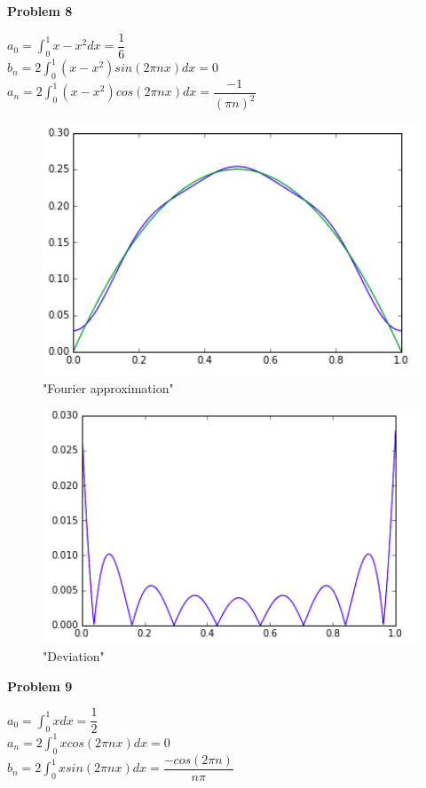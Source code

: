 \documentclass[12pt]{article}
\begin{document}
    \textbf{Problem 8}
    
    $a_0 = \int^1_0 x - x^2 dx = \dfrac{1}{6}$\\
    $b_n = 2 \int^1_0 (x - x^2) sin(2 \pi n x)dx = 0$\\
    $a_n = 2 \int^1_0 (x - x^2) cos(2 \pi n x)dx = \dfrac{-1}{(\pi n) ^2}$
    
    \begin{figure}[H]
    	\centering
    	\includegraphics[width=15cm]{1}
    	\caption{"Fourier approximation"}
    \end{figure}
    
    \begin{figure}[H]
    	\centering
    	\includegraphics[width=15cm]{2}
    	\caption{"Deviation"}
    \end{figure}
    
    \textbf{Problem 9}
    
    $a_0 = \int^1_0 x dx = \dfrac{1}{2}$\\
    $a_n = 2 \int^1_0 x cos(2 \pi n x)dx = 0$\\
    $b_n = 2 \int^1_0 x sin(2 \pi n x)dx = \dfrac{-cos(2\pi n)}{n \pi}$
    
\end{document}
